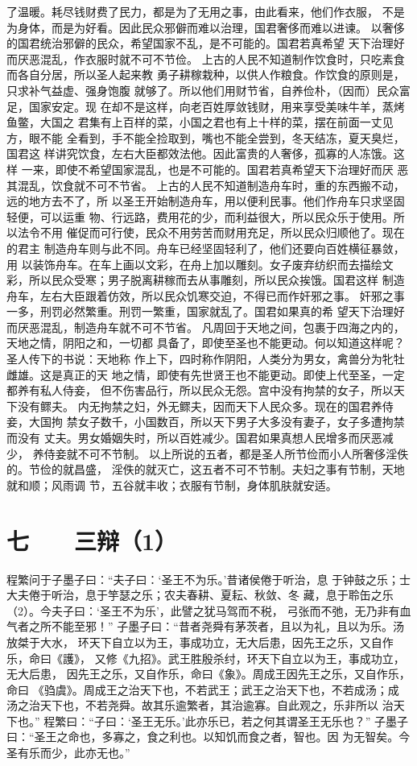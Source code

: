 \documentclass[12pt,UTF8]{ctexbook}
\begin{document}
了温暖。耗尽钱财费了民力，都是为了无用之事，由此看来，他们作衣服， 
不是为身体，而是为好看。因此民众邪僻而难以治理，国君奢侈而难以进谏。 
以奢侈的国君统治邪僻的民众，希望国家不乱，是不可能的。国君若真希望 
天下治理好而厌恶混乱，作衣服时就不可不节俭。 
上古的人民不知道制作饮食时，只吃素食而各自分居，所以圣人起来教 
勇子耕稼栽种，以供人作粮食。作饮食的原则是，只求补气益虚、强身饱腹 
就够了。所以他们用财节省，自养俭朴，（因而）民众富足，国家安定。现 
在却不是这样，向老百姓厚敛钱财，用来享受美味牛羊，蒸烤鱼鳖，大国之 
君集有上百样的菜，小国之君也有上十样的菜，摆在前面一丈见方，眼不能 
全看到，手不能全捡取到，嘴也不能全尝到，冬天结冻，夏天臭烂，国君这 
样讲究饮食，左右大臣都效法他。因此富贵的人奢侈，孤寡的人冻饿。这样 
一来，即使不希望国家混乱，也是不可能的。国君若真希望天下治理好而厌 
恶其混乱，饮食就不可不节省。 
上古的人民不知道制造舟车时，重的东西搬不动，远的地方去不了，所 
以圣王开始制造舟车，用以便利民事。他们作舟车只求坚固轻便，可以运重 
物、行远路，费用花的少，而利益很大，所以民众乐于使用。所以法令不用 
催促而可行使，民众不用劳苦而财用充足，所以民众归顺他了。现在的君主 
制造舟车则与此不同。舟车已经坚固轻利了，他们还要向百姓横征暴敛，用 
以装饰舟车。在车上画以文彩，在舟上加以雕刻。女子废弃纺织而去描绘文 
彩，所以民众受寒；男子脱离耕稼而去从事雕刻，所以民众挨饿。国君这样 
制造舟车，左右大臣跟着仿效，所以民众饥寒交迫，不得已而作奸邪之事。 
奸邪之事一多，刑罚必然繁重。刑罚一繁重，国家就乱了。国君如果真的希 
望天下治理好而厌恶混乱，制造舟车就不可不节省。 
凡周回于天地之间，包裹于四海之内的，天地之情，阴阳之和，一切都 
具备了，即使至圣也不能更动。何以知道这样呢？圣人传下的书说：天地称 
作上下，四时称作阴阳，人类分为男女，禽兽分为牝牡雌雄。这是真正的天 
地之情，即使有先世贤王也不能更动。即使上代至圣，一定都养有私人侍妾， 
但不伤害品行，所以民众无怨。宫中没有拘禁的女子，所以天下没有鳏夫。 
内无拘禁之妇，外无鳏夫，因而天下人民众多。现在的国君养侍妾，大国拘 
禁女子数千，小国数百，所以天下男子大多没有妻子，女子多遭拘禁而没有 
丈夫。男女婚姻失时，所以百姓减少。国君如果真想人民增多而厌恶减少， 
养侍妾就不可不节制。 
以上所说的五者，都是圣人所节俭而小人所奢侈淫佚的。节俭的就昌盛， 
淫佚的就灭亡，这五者不可不节制。夫妇之事有节制，天地就和顺；风雨调 
节，五谷就丰收；衣服有节制，身体肌肤就安适。 

\chapter{七　　三辩（1）}

程繁问于子墨子曰：“夫子曰：‘圣王不为乐。’昔诸侯倦于听治，息 
于钟鼓之乐；士大夫倦于听治，息于竽瑟之乐；农夫春耕、夏耘、秋敛、冬 
藏，息于聆缶之乐（2）。今夫子曰：‘圣王不为乐’，此譬之犹马驾而不税， 
弓张而不弛，无乃非有血气者之所不能至邪！” 
子墨子曰：“昔者尧舜有茅茨者，且以为礼，且以为乐。汤放桀于大水， 
环天下自立以为王，事成功立，无大后患，因先王之乐，又自作乐，命曰《護》， 
又修《九招》。武王胜殷杀纣，环天下自立以为王，事成功立，无大后患， 
因先王之乐，又自作乐，命曰《象》。周成王因先王之乐，又自作乐，命曰 
《驺虞》。周成王之治天下也，不若武王；武王之治天下也，不若成汤；成 
汤之治天下也，不若尧舜。故其乐逾繁者，其治逾寡。自此观之，乐非所以 
治天下也。” 
程繁曰：“子曰：‘圣王无乐。’此亦乐已，若之何其谓圣王无乐也？” 
子墨子曰：“圣王之命也，多寡之，食之利也。以知饥而食之者，智也。因 
为无智矣。今圣有乐而少，此亦无也。” 
\end{document}

